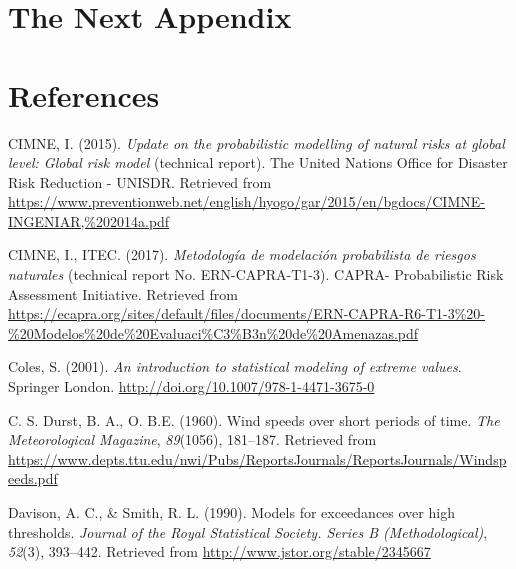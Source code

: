 \documentclass[12pt,oneside]{reedthesis}
\begin{document}
\hypertarget{the-next-appendix}{%
\chapter{The Next Appendix}\label{the-next-appendix}}

\backmatter

\hypertarget{references}{%
\chapter*{References}\label{references}}


\noindent

\setlength{\parindent}{-0.20in}
\setlength{\leftskip}{0.20in}
\setlength{\parskip}{8pt}

\hypertarget{refs}{}
\leavevmode\hypertarget{ref-hurricanemaps}{}%
CIMNE, I. (2015). \emph{Update on the probabilistic modelling of natural risks at global level: Global risk model} (technical report). The United Nations Office for Disaster Risk Reduction - UNISDR. Retrieved from \url{https://www.preventionweb.net/english/hyogo/gar/2015/en/bgdocs/CIMNE-INGENIAR,\%202014a.pdf}

\leavevmode\hypertarget{ref-hurricanemaps2}{}%
CIMNE, I., ITEC. (2017). \emph{Metodología de modelación probabilista de riesgos naturales} (technical report No. ERN-CAPRA-T1-3). CAPRA- Probabilistic Risk Assessment Initiative. Retrieved from \url{https://ecapra.org/sites/default/files/documents/ERN-CAPRA-R6-T1-3\%20-\%20Modelos\%20de\%20Evaluaci\%C3\%B3n\%20de\%20Amenazas.pdf}

\leavevmode\hypertarget{ref-Coles2001}{}%
Coles, S. (2001). \emph{An introduction to statistical modeling of extreme values}. Springer London. \url{http://doi.org/10.1007/978-1-4471-3675-0}

\leavevmode\hypertarget{ref-Durst1960}{}%
C. S. Durst, B. A., O. B.E. (1960). Wind speeds over short periods of time. \emph{The Meteorological Magazine}, \emph{89}(1056), 181--187. Retrieved from \url{https://www.depts.ttu.edu/nwi/Pubs/ReportsJournals/ReportsJournals/Windspeeds.pdf}

\leavevmode\hypertarget{ref-Davison1990}{}%
Davison, A. C., \& Smith, R. L. (1990). Models for exceedances over high thresholds. \emph{Journal of the Royal Statistical Society. Series B (Methodological)}, \emph{52}(3), 393--442. Retrieved from \url{http://www.jstor.org/stable/2345667}
\end{document}
